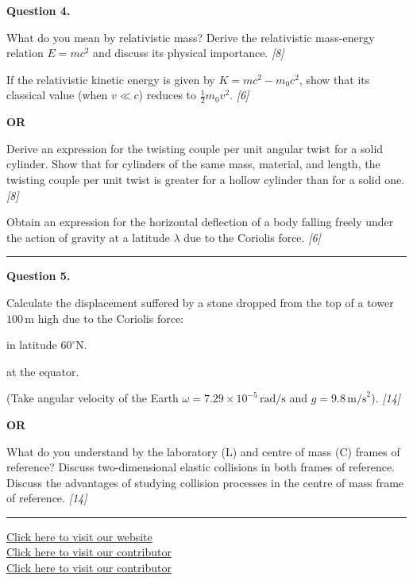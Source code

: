 \documentclass[11pt,a4paper]{article}
\newcommand{\pts}[1]{\hfill   \textit{[#1]}}
\begin{document}
\noindent   \textbf{Question 4.}

\begin{parts}
  \item What do you mean by relativistic mass? Derive the relativistic mass-energy relation $E = mc^2$ and discuss its physical importance. \pts{8}
  \item If the relativistic kinetic energy is given by $K = mc^2 - m_0 c^2$, show that its classical value (when $v \ll c$) reduces to $\frac{1}{2} m_0 v^2$. \pts{6}
\end{parts}
\hfill   \textbf{OR}

\begin{parts}
  \item Derive an expression for the twisting couple per unit angular twist for a solid cylinder. Show that for cylinders of the same mass, material, and length, the twisting couple per unit twist is greater for a hollow cylinder than for a solid one. \pts{8}
  \item Obtain an expression for the horizontal deflection of a body falling freely under the action of gravity at a latitude $\lambda$ due to the Coriolis force. \pts{6}
\end{parts}

\medskip\rule{\linewidth}{0.2pt}




\noindent   \textbf{Question 5.}

\begin{parts}
  \item Calculate the displacement suffered by a stone dropped from the top of a tower $100\, \text{m}$ high due to the Coriolis force:
    
\begin{parts}
      \item in latitude $60^\circ \text{N}$.
      \item at the equator.
    \end{parts}
    (Take angular velocity of the Earth $\omega = 7.29  \times 10^{-5}\, \text{rad/s}$ and $g = 9.8\, \text{m/s}^2$). \pts{14}
\end{parts}
\hfill   \textbf{OR}

\begin{parts}
  \item What do you understand by the laboratory (L) and centre of mass (C) frames of reference? Discuss two-dimensional elastic collisions in both frames of reference. Discuss the advantages of studying collision processes in the centre of mass frame of reference. \pts{14}
\end{parts}

\vfill
\rule{\linewidth}{0.4pt}

\begin{center}\small
  \href{https://bhu-exam.vercel.app/}{Click here to visit our website}\\[4pt]
  \href{https://me-aryan.vercel.app/}{Click here to visit our contributor}\\[4pt]
  \href{https://quashan-me.vercel.app/}{Click here to visit our contributor}
\end{center}
\end{document}
